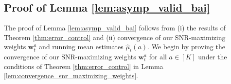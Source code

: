 \documentclass{article}
\begin{document}
\begin{appendices}






\subsection{Proof of Lemma \ref{lem:asymp_valid_bai}}

The proof of Lemma \ref{lem:asymp_valid_bai} follows from (i) the results of Theorem \ref{thm:error_control} and (ii) convergence of our SNR-maximizing weights $\bm{w}_t^a$ and running mean estimates $\hat\mu_t(a)$. We begin by proving the convergence of our SNR-maximizing weights $\bm{w}_t^a$ for all $a\in [K]$ under the conditions of Theorem \ref{thm:error_control} in Lemma \ref{lem:convergence_snr_maximizing_weights}.


\end{appendices}
\end{document}
